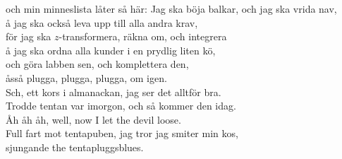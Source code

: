 \documentclass[a6paper, 10pt, twoside]{article}
\begin{document}
\begin{lyrics}
och min minneslista låter så här:
\newpage
\noindent
Jag ska böja balkar, och jag ska vrida nav, \\
å jag ska också leva upp till alla andra krav, \\
för jag ska  $z$-transformera, räkna om, och integrera \\
å jag ska ordna alla kunder i en prydlig liten kö, \\
och göra labben sen, och komplettera den, \\
åsså plugga, plugga, plugga, om igen.
\vspace{5pt} \\
Sch, ett kors i almanackan, jag ser det alltför bra. \\
Trodde tentan var imorgon, och så kommer den idag. \\
Åh åh åh, well, now I let the devil loose. \\
Full fart mot tentapuben, jag tror jag smiter min kos, \\
sjungande the tentapluggsblues. 
\end{lyrics}
\end{document}
